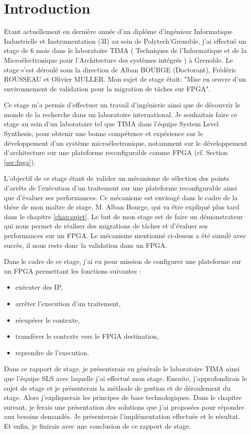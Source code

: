 \chapter{Introduction}
\label{chap:intro}
\OnehalfSpacing
\setlength{\parindent}{2em}
Etant actuellement en dernière année d'un diplôme d'ingénieur Informatique Industrielle et Instrumentation (3I) au sein de Polytech'Grenoble, 
j'ai effectué un stage de 6 mois dans le laboratoire TIMA ( Techniques de l'Informatique et de la Microélectronique 
pour l'Architecture des systèmes intégrés ) à Grenoble. 
Le stage s'est déroulé sous la direction de Alban BOURGE (Doctorant), Frédéric ROUSSEAU et Olivier MULLER. 
Mon sujet de stage était: "Mise en œuvre d'un environnement de validation pour la migration de tâches sur FPGA".

Ce stage m'a permis d'effectuer un travail d'ingénierie ainsi que de découvrir le monde de la recherche
dans un laboratoire international. Je souhaitais faire ce stage au sein d'un laboratoire tel que TIMA dans l'équipe System Level Synthesis, pour obtenir une bonne compétence et expérience sur le développement d'un système microélectronique, notamment sur le développement d'architecture sur une plateforme reconfigurable comme FPGA (cf. Section \ref{sec:fpga}). 

L'objectif de ce stage étant de valider un mécanisme de sélection des points d'arrêts de l'exécution d'un traitement sur une plateforme reconfigurable ainsi que d'évaluer ses performances. 
Ce mécanisme est envisagé dans le cadre de la thèse de mon maître de stage, M. Alban Bourge, qui va être expliqué plus tard dans le chapitre \ref{chap:sujet}. 
Le but de mon stage est de faire un démonstrateur qui nous permet de réaliser des migrations de tâches et d'évaluer ses performances sur un FPGA.
Le mécanisme mentionné ci-dessus a été simulé avec succès, il nous reste donc la validation dans un FPGA. 

Dans le cadre de ce stage, j'ai eu pour mission de configurer une plateforme sur un FPGA permettant les fonctions suivantes :
\begin{itemize}
\item exécuter des IP,
\item arrêter l'execution d'un traitement,
\item récupérer le contexte,
\item transférer le contexte vers le FPGA destination,
\item reprendre de l'execution.
\end{itemize}

Dans ce rapport de stage, je présenterais en générale le laboratoire TIMA ainsi que l'équipe SLS avec laquelle j'ai effectué mon stage. Ensuite, j'approfondirais le sujet de stage et je
présenterais la méthode de gestion et de déroulement du stage. Alors j'expliquerais les principes de base technologiques. Dans le chapitre suivant, je ferais une présentation des solutions
que j'ai proposées pour répondre aux besoins demandés. Je présenterais l'implémentation effectuée et le résultat.
Et enfin, je finirais avec une conclusion de ce rapport de stage.